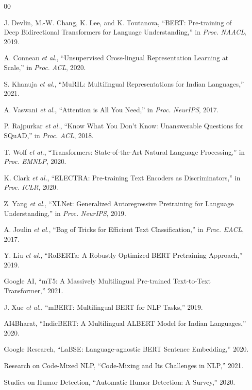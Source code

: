 \documentclass[conference]{IEEEtran}
\begin{document}
\begin{thebibliography}{00}

 J. Devlin, M.-W. Chang, K. Lee, and K. Toutanova, ``BERT: Pre-training of Deep Bidirectional Transformers for Language Understanding,'' in \textit{Proc. NAACL}, 2019.

 A. Conneau \textit{et al.}, ``Unsupervised Cross-lingual Representation Learning at Scale,'' in \textit{Proc. ACL}, 2020.

 S. Khanuja \textit{et al.}, ``MuRIL: Multilingual Representations for Indian Languages,'' 2021.

 A. Vaswani \textit{et al.}, ``Attention is All You Need,'' in \textit{Proc. NeurIPS}, 2017.

 P. Rajpurkar \textit{et al.}, ``Know What You Don’t Know: Unanswerable Questions for SQuAD,'' in \textit{Proc. ACL}, 2018.

 T. Wolf \textit{et al.}, ``Transformers: State-of-the-Art Natural Language Processing,'' in \textit{Proc. EMNLP}, 2020.

 K. Clark \textit{et al.}, ``ELECTRA: Pre-training Text Encoders as Discriminators,'' in \textit{Proc. ICLR}, 2020.

 Z. Yang \textit{et al.}, ``XLNet: Generalized Autoregressive Pretraining for Language Understanding,'' in \textit{Proc. NeurIPS}, 2019.

 A. Joulin \textit{et al.}, ``Bag of Tricks for Efficient Text Classification,'' in \textit{Proc. EACL}, 2017.

 Y. Liu \textit{et al.}, ``RoBERTa: A Robustly Optimized BERT Pretraining Approach,'' 2019.

 Google AI, ``mT5: A Massively Multilingual Pre-trained Text-to-Text Transformer,'' 2021.

 J. Xue \textit{et al.}, ``mBERT: Multilingual BERT for NLP Tasks,'' 2019.

 AI4Bharat, ``IndicBERT: A Multilingual ALBERT Model for Indian Languages,'' 2020.

 Google Research, ``LaBSE: Language-agnostic BERT Sentence Embedding,'' 2020.

 Research on Code-Mixed NLP, ``Code-Mixing and Its Challenges in NLP,'' 2021.

 Studies on Humor Detection, ``Automatic Humor Detection: A Survey,'' 2020.

\end{thebibliography}
\end{document}
